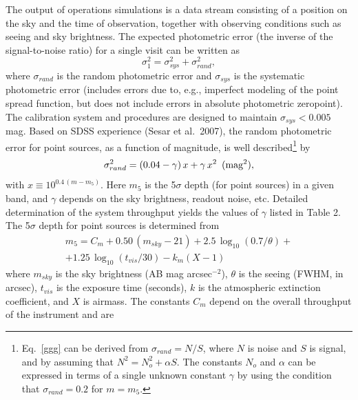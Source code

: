 \documentclass{emulateapj}
\begin{document}
The output of operations simulations is a data stream consisting of 
a position on the sky and the time of observation, together with 
observing conditions such as seeing and sky brightness. The expected 
photometric error (the inverse of the signal-to-noise ratio) for a single visit
can be written as
\begin{equation}
         \sigma_1^2 = \sigma_{sys}^2 + \sigma_{rand}^2,
\end{equation}
where $\sigma_{rand}$ is the random photometric error and $\sigma_{sys}$ is 
the systematic photometric error (includes errors due to, e.g., imperfect
modeling of the point spread function, but does not include errors in 
absolute photometric zeropoint). The calibration system and procedures
are designed to maintain $\sigma_{sys}<0.005$ mag. Based on 
SDSS experience (Sesar et al.~2007), the random photometric error for
point sources, as
a function of magnitude, is well described\footnote{Eq.~\ref{ggg} can 
be derived from $\sigma_{rand}=N/S$, where $N$ is noise and $S$ is signal, 
and by assuming that $N^2 = N_o^2 + \alpha S$. The constants $N_o$ and 
$\alpha$ can be expressed in terms of a single unknown constant $\gamma$ 
by using the condition that $\sigma_{rand}=0.2$ for $m=m_5$.} by
\begin{equation}
\label{ggg}
  \sigma_{rand}^2 = (0.04-\gamma)\, x + \gamma \, x^2 \,\,\, {\rm (mag^2),}
\end{equation}
with $x \equiv 10^{0.4\,(m-m_5)}$. Here $m_5$ is the 5$\sigma$ depth (for
point sources) in a given band, and $\gamma$ depends on the sky 
brightness, readout noise, etc. 
Detailed determination of the system throughput yields the values of $\gamma$ 
listed in Table 2. The 5$\sigma$ depth for point sources is determined from 
\begin{eqnarray}
\label{m5}
  m_5 = C_m + 0.50\,(m_{sky}-21) + 2.5\,\log_{10}(0.7/\theta) +  \nonumber \\
        + 1.25\,\log_{10}(t_{vis}/30) - k_m(X-1) \phantom{xxxxx}
\end{eqnarray}
where $m_{sky}$ is the sky brightness (AB mag arcsec$^{-2}$), $\theta$ is 
the seeing (FWHM, in arcsec), $t_{vis}$ is the exposure time (seconds),
$k$ is the atmospheric extinction coefficient, and $X$ is airmass. 
The constants $C_m$ depend on the overall throughput of the instrument
and are 
\end{document}
